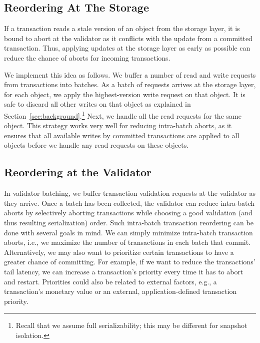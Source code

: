 \subsection{Reordering At The Storage}
If a transaction reads a stale version of an object from the storage layer, it is bound to 
abort at the validator as it conflicts with the update from a committed transaction. 
Thus, applying updates at the storage layer as early as possible can 
reduce the chance of aborts for incoming transactions.

We implement this idea as follows. We buffer a number of read and write requests from transactions into batches. 
As a batch of requests arrives at the storage layer, for each object, we apply the highest-version write request on that object. It is safe to discard all other writes on that object as explained in Section~\ref{sec:background}.\footnote{Recall that we assume full serializability; this may be different for snapshot isolation.} 
Next, we handle all the read requests for the same object. This strategy works very well for reducing intra-batch aborts, 
as it ensures that all available writes by committed transactions are applied to all objects before we handle any read requests on these objects. 

\subsection{Reordering at the Validator}\label{subsec:validator_reordering}

In validator batching, we buffer transaction validation requests at the validator as they arrive. Once a batch has been collected, the validator can reduce intra-batch aborts by selectively aborting transactions while choosing a good validation (and thus resulting serialization) order.
Such intra-batch transaction reordering can be done with several goals in mind. We can simply minimize intra-batch transaction aborts, i.e., we maximize the number of transactions in each batch that commit. Alternatively, we may also want to prioritize certain transactions to have a greater chance of committing. For example, if we want to reduce the transactions' tail latency, we can increase a transaction's priority every time it has to abort and restart. Priorities could also be related to external factors, e.g., a transaction's monetary value or an external, application-defined transaction priority. 

